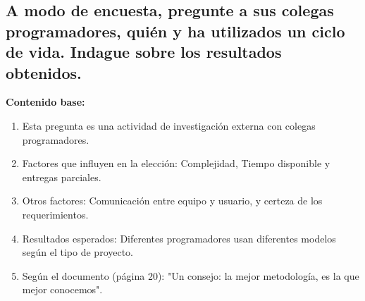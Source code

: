 \documentclass{article}
\begin{document}
\subsection{A modo de encuesta, pregunte a sus colegas programadores, quién y ha utilizados un ciclo de vida. Indague sobre los resultados obtenidos.}

\begin{framed}
\noindent\textbf{Contenido base:}
\begin{enumerate}
    \item Esta pregunta es una actividad de investigación externa con colegas programadores.
    \item Factores que influyen en la elección: Complejidad, Tiempo disponible y entregas parciales.
    \item Otros factores: Comunicación entre equipo y usuario, y certeza de los requerimientos.
    \item Resultados esperados: Diferentes programadores usan diferentes modelos según el tipo de proyecto.
    \item Según el documento (página 20): "Un consejo: la mejor metodología, es la que mejor conocemos".
\end{enumerate}
\end{framed}
\end{document}
